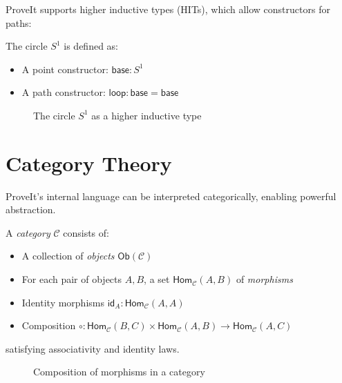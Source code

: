 \documentclass[11pt,a4paper,twoside]{report}
\newcommand{\Hom}[3]{\mathsf{Hom}_{#1}(#2, #3)}
\newcommand{\id}[1]{\mathsf{id}_{#1}}
\begin{document}
ProveIt supports higher inductive types (HITs), which allow constructors for paths:

\begin{example}
\label{ex:circle}
The circle $S^1$ is defined as:
\begin{itemize}
    \item A point constructor: $\mathsf{base} : S^1$
    \item A path constructor: $\mathsf{loop} : \mathsf{base} = \mathsf{base}$
\end{itemize}
\end{example}

\begin{figure}[htbp]
\centering
{}
\caption{The circle $S^1$ as a higher inductive type}
\label{fig:circle}
\end{figure}

\section{Category Theory}

ProveIt's internal language can be interpreted categorically, enabling powerful abstraction.

\begin{definition}[Category]
\label{def:category}
A \emph{category} $\mathcal{C}$ consists of:
\begin{itemize}
    \item A collection of \emph{objects} $\mathsf{Ob}(\mathcal{C})$
    \item For each pair of objects $A, B$, a set $\Hom{\mathcal{C}}{A}{B}$ of \emph{morphisms}
    \item Identity morphisms $\id{A} : \Hom{\mathcal{C}}{A}{A}$
    \item Composition $\circ : \Hom{\mathcal{C}}{B}{C} \times \Hom{\mathcal{C}}{A}{B} \to \Hom{\mathcal{C}}{A}{C}$
\end{itemize}
satisfying associativity and identity laws.
\end{definition}

\begin{figure}[htbp]
\centering
{}
\caption{Composition of morphisms in a category}
\label{fig:composition}
\end{figure}
\end{document}
